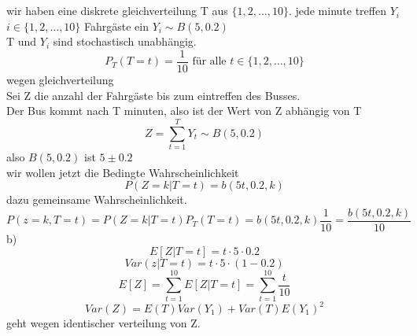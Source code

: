 \documentclass{article}
\begin{document}
	\section{}
	wir haben eine diskrete gleichverteilung T aus $\{1,2,\dots,10\}$. jede minute treffen $Y_i$  $i\in\{1,2,\dots,10\}$ Fahrgäste ein $Y_i\sim B(5,0.2)$\\
	T und $Y_i$ sind stochastisch unabhängig.\\
	\[P_T(T=t)=\frac{1}{10}\text{ für alle }t\in\{1,2,\dots,10\}\]
	wegen gleichverteilung \\
	Sei Z die anzahl der Fahrgäste bis zum eintreffen des Busses.\\
	Der Bus kommt nach T minuten, also ist der Wert von Z abhängig von T
	\[Z = \sum^T_{t=1}Y_t\sim B(5,0.2)\]
	also $B(5,0.2) $ ist $5\pm 0.2$\\
	wir wollen jetzt die Bedingte Wahrscheinlichkeit
	\[P(Z=k|T=t)=b(5t,0.2,k)\]
	dazu gemeinsame Wahrscheinlichkeit.
	\[P(z=k,T=t) = P(Z=k|T=t)P_T(T=t) = b(5t,0.2,k)\frac{1}{10} = \frac{b(5t,0.2,k)}{10}\]
	b)\\
	\[E[Z|T=t]=t\cdot 5\cdot 0.2\]
	\[Var(z|T=t) = t\cdot 5\cdot (1-0.2)\]
	\[E[Z] = \sum^{10}_{t=1} E[Z|T=t]=\sum_{t=1}^{10}\frac{t}{10}\]
	\[Var(Z)=E(T)Var(Y_1)+Var(T)E(Y_1)^2\]
	geht wegen identischer verteilung von Z.
\end{document}
